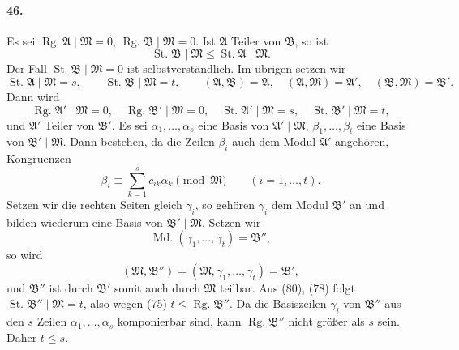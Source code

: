 \documentclass[11pt]{article}
\newcommand{\Rg}{\operatorname{Rg.}}
\newcommand{\Md}{\operatorname{Md.}}
\newcommand{\St}{\operatorname{St.}}
\begin{document}
\paragraph{46.}
Es sei $\Rg\mathfrak A\mid\mathfrak M=0$, $\Rg\mathfrak B\mid\mathfrak M=0$. Ist $\mathfrak A$ Teiler von $\mathfrak B$, so ist
\begin{equation}
\St\mathfrak B\mid\mathfrak M\le \St\mathfrak A\mid\mathfrak M.
\tag{76}
\end{equation}
Der Fall $\St\mathfrak B\mid\mathfrak M=0$ ist selbstverständlich. Im übrigen setzen wir
\begin{equation}
\St\mathfrak A\mid\mathfrak M=s,
\qquad
\St\mathfrak B\mid\mathfrak M=t,
\qquad
(\mathfrak A,
\mathfrak B)=\mathfrak A,
\quad
(\mathfrak A,
\mathfrak M)=\mathfrak A',
\quad
(\mathfrak B,
\mathfrak M)=\mathfrak B'.
\tag{77}
\end{equation}
Dann wird
\begin{equation}
\Rg\mathfrak A'\mid\mathfrak M=0,
\quad
\Rg\mathfrak B'\mid\mathfrak M=0,
\quad
\St\mathfrak A'\mid\mathfrak M=s,
\quad
\St\mathfrak B'\mid\mathfrak M=t,
\tag{78}
\end{equation}
und $\mathfrak A'$ Teiler von $\mathfrak B'$. Es sei $\alpha_1,
\ldots,
\alpha_s$ eine Basis von $\mathfrak A'\mid\mathfrak M$, $\beta_1,
\ldots,
\beta_t$ eine Basis von $\mathfrak B'\mid\mathfrak M$. Dann bestehen, da die Zeilen $\beta_i$ auch dem Modul $\mathfrak A'$ angehören, Kongruenzen
\[
\beta_i\equiv \sum_{k=1}^{s}c_{ik}\alpha_k\pmod{\mathfrak M}
\qquad(i=1,
\ldots,t).
\tag{79}
\]
Setzen wir die rechten Seiten gleich $\gamma_i$, so gehören $\gamma_i$ dem Modul $\mathfrak B'$ an und bilden wiederum eine Basis von $\mathfrak B'\mid\mathfrak M$. Setzen wir
\[
\Md(\gamma_1,
\ldots,
\gamma_t)=\mathfrak B'',
\]
so wird
\begin{equation}
(\mathfrak M,
\mathfrak B'')=(\mathfrak M,
\gamma_1,
\ldots,
\gamma_t)=\mathfrak B',
\tag{80}
\end{equation}
und $\mathfrak B''$ ist durch $\mathfrak B'$ somit auch durch $\mathfrak M$ teilbar. Aus (80), (78) folgt $\St\mathfrak B''\mid\mathfrak M=t$, also wegen (75) $t\le\Rg\mathfrak B''$. Da die Basiszeilen $\gamma_i$ von $\mathfrak B''$ aus den $s$ Zeilen $\alpha_1,
\ldots,
\alpha_s$ komponierbar sind, kann $\Rg\mathfrak B''$ nicht größer als $s$ sein. Daher $t\le s$.
\end{document}
